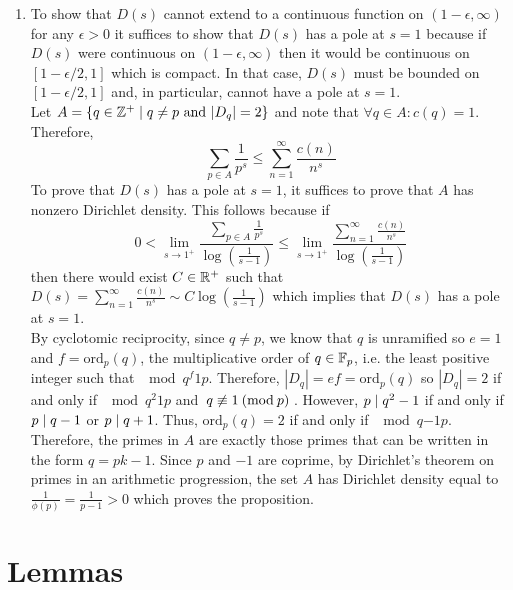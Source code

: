\documentclass[12pt]{extarticle}
\renewcommand{\ord}[2]{\mathrm{ord}_{#1}(#2)}
\begin{document}
\begin{enumerate}
\begin{enumerate}
\item To show that $D(s)$ cannot extend to a continuous function on $(1 - \epsilon, \infty)$ for any $\epsilon > 0$ it suffices to show that $D(s)$ has a pole at $s = 1$ because if $D(s)$ were continuous on $(1 - \epsilon, \infty)$ then it would be continuous on $[1 - \epsilon/2, 1]$ which is compact. In that case, $D(s)$ must be bounded on $[1 - \epsilon/2, 1]$ and, in particular, cannot have a pole at $s = 1$. \bigskip \\
Let $A = \{ q \in \mathbb{Z}^{+} \mid  q \neq p \text{ and } |D_q| = 2\}$ and note that $\forall q \in A : c(q) = 1$. Therefore, 
\[ \sum_{p \in A} \frac{1}{p^s} \le \sum_{n = 1}^\infty \frac{c(n)}{n^s} \]
To prove that $D(s)$ has a pole at $s = 1$, it suffices to prove that $A$ has nonzero Dirichlet density. This follows because if
\[ 0 < \lim_{s \to 1^{+}} \frac{\sum\limits_{p \in A} \frac{1}{p^s}}{\log\left(\frac{1}{s - 1} \right)} \le \lim_{s \to 1^{+}} \frac{\sum\limits_{n = 1}^\infty \frac{c(n)}{n^s}}{\log\left(\frac{1}{s - 1} \right)}\]
then there would exist $C \in \mathbb{R}^+$ such that $D(s) = \sum\limits_{n = 1}^\infty \frac{c(n)}{n^s} \sim C \log\left(\frac{1}{s - 1} \right) $ which implies that $D(s)$ 
has a pole at $s = 1$. \bigskip \\
By cyclotomic reciprocity, since $q \neq p$, we know that $q$ is unramified so $e = 1$ and $f = \ord{p}{q}$, the multiplicative order of $q \in \mathbb{F}_{p}$, i.e. the least positive integer such that $\mod{q^f}{1}{p}$. Therefore, $|D_q| = ef = \ord{p}{q}$ so $|D_q| = 2$ if and only if $\mod{q^2}{1}{p}$ and $\nmod{q}{1}{p}$. However, $p \mid q^2 - 1$ if and only if $p \mid q - 1$ or $p \mid q + 1$. Thus, $\ord{p}{q} = 2$ if and only if $\mod{q}{-1}{p}$. Therefore, the primes in $A$ are exactly those primes that can be written in the form $q = pk - 1$. Since $p$ and $-1$ are coprime, by Dirichlet's theorem on primes in an arithmetic progression, the set $A$ has Dirichlet density equal to $\frac{1}{\phi(p)} = \frac{1}{p-1} > 0$ which proves the proposition.   

\end{enumerate}
\end{enumerate}

\section*{Lemmas}
\end{document}
